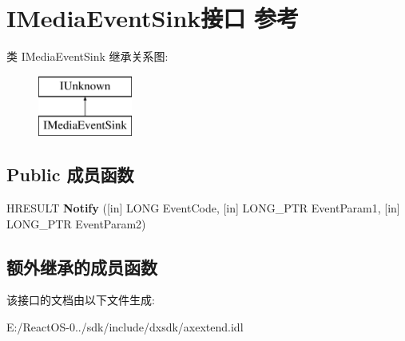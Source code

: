 \hypertarget{interface_i_media_event_sink}{}\section{I\+Media\+Event\+Sink接口 参考}
\label{interface_i_media_event_sink}
类 I\+Media\+Event\+Sink 继承关系图\+:\begin{figure}[H]
\begin{center}
\leavevmode
\includegraphics[height=2.000000cm]{interface_i_media_event_sink}
\end{center}
\end{figure}
\subsection*{Public 成员函数}
\begin{DoxyCompactItemize}
\item 
\mbox{\label{interface_i_media_event_sink_a2941ee58e0c8c878aff715ef5abf9c95}} 
H\+R\+E\+S\+U\+LT {\bfseries Notify} (\mbox{[}in\mbox{]} L\+O\+NG Event\+Code, \mbox{[}in\mbox{]} L\+O\+N\+G\+\_\+\+P\+TR Event\+Param1, \mbox{[}in\mbox{]} L\+O\+N\+G\+\_\+\+P\+TR Event\+Param2)
\end{DoxyCompactItemize}
\subsection*{额外继承的成员函数}


该接口的文档由以下文件生成\+:\begin{DoxyCompactItemize}
\item 
E\+:/\+React\+O\+S-\/0../sdk/include/dxsdk/axextend.\+idl\end{DoxyCompactItemize}
